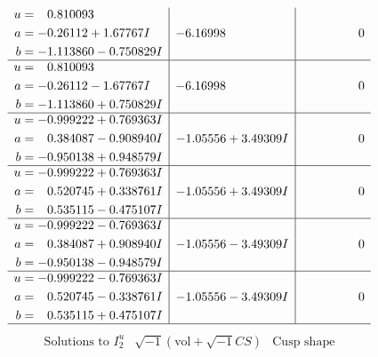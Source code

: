 \documentclass[1p]{elsarticle_modified}
\theoremstyle{definition}
\newcommand{\I}{\sqrt{-1}}
\begin{document}
$$\begin{array}{c|c|c}
\begin{aligned}
u &= \phantom{-}0.810093\phantom{ +0.000000I} \\
a &= -0.26112 + 1.67767 I \\
b &= -1.113860 - 0.750829 I\end{aligned}
 & -6.16998\phantom{ +0.000000I} & \phantom{-0.000000 } 0 \\ \hline\begin{aligned}
u &= \phantom{-}0.810093\phantom{ +0.000000I} \\
a &= -0.26112 - 1.67767 I \\
b &= -1.113860 + 0.750829 I\end{aligned}
 & -6.16998\phantom{ +0.000000I} & \phantom{-0.000000 } 0 \\ \hline\begin{aligned}
u &= -0.999222 + 0.769363 I \\
a &= \phantom{-}0.384087 - 0.908940 I \\
b &= -0.950138 + 0.948579 I\end{aligned}
 & -1.05556 + 3.49309 I & \phantom{-0.000000 } 0 \\ \hline\begin{aligned}
u &= -0.999222 + 0.769363 I \\
a &= \phantom{-}0.520745 + 0.338761 I \\
b &= \phantom{-}0.535115 - 0.475107 I\end{aligned}
 & -1.05556 + 3.49309 I & \phantom{-0.000000 } 0 \\ \hline\begin{aligned}
u &= -0.999222 - 0.769363 I \\
a &= \phantom{-}0.384087 + 0.908940 I \\
b &= -0.950138 - 0.948579 I\end{aligned}
 & -1.05556 - 3.49309 I & \phantom{-0.000000 } 0 \\ \hline\begin{aligned}
u &= -0.999222 - 0.769363 I \\
a &= \phantom{-}0.520745 - 0.338761 I \\
b &= \phantom{-}0.535115 + 0.475107 I\end{aligned}
 & -1.05556 - 3.49309 I & \phantom{-0.000000 } 0\\
 \hline 
 \end{array}$$\newpage$$\begin{array}{c|c|c}  
\text{Solutions to }I^u_{2}& \I (\text{vol} + \sqrt{-1}CS) & \text{Cusp shape}\\
 \hline 
\begin{aligned}

\end{aligned}
\end{array}$$
\end{document}
